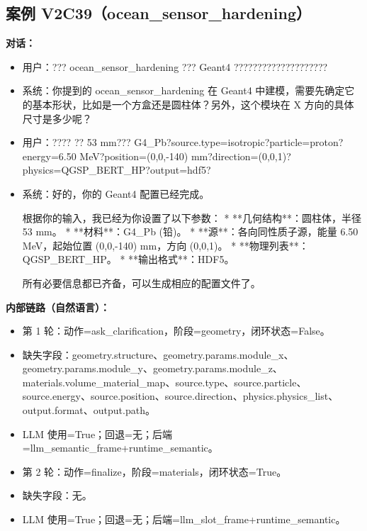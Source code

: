 \documentclass[11pt]{ctexart}
\begin{document}
\subsection{案例 V2C39（ocean\_sensor\_hardening）}
\textbf{对话：}
\begin{itemize}
\item 用户：??? ocean\_sensor\_hardening ??? Geant4 ????????????????????
\item 系统：你提到的 ocean\_sensor\_hardening 在 Geant4 中建模，需要先确定它的基本形状，比如是一个方盒还是圆柱体？另外，这个模块在 X 方向的具体尺寸是多少呢？
\item 用户：???? ?? 53 mm??? G4\_Pb?source.type=isotropic?particle=proton?energy=6.50 MeV?position=(0,0,-140) mm?direction=(0,0,1)?physics=QGSP\_BERT\_HP?output=hdf5?
\item 系统：好的，你的 Geant4 配置已经完成。

根据你的输入，我已经为你设置了以下参数：
*   **几何结构**：圆柱体，半径 53 mm。
*   **材料**：G4\_Pb (铅)。
*   **源**：各向同性质子源，能量 6.50 MeV，起始位置 (0,0,-140) mm，方向 (0,0,1)。
*   **物理列表**：QGSP\_BERT\_HP。
*   **输出格式**：HDF5。

所有必要信息都已齐备，可以生成相应的配置文件了。
\end{itemize}
\textbf{内部链路（自然语言）：}
\begin{itemize}
\item 第 1 轮：动作=ask\_clarification，阶段=geometry，闭环状态=False。
\item 缺失字段：geometry.structure、geometry.params.module\_x、geometry.params.module\_y、geometry.params.module\_z、materials.volume\_material\_map、source.type、source.particle、source.energy、source.position、source.direction、physics.physics\_list、output.format、output.path。
\item LLM 使用=True；回退=无；后端=llm\_semantic\_frame+runtime\_semantic。
\item 第 2 轮：动作=finalize，阶段=materials，闭环状态=True。
\item 缺失字段：无。
\item LLM 使用=True；回退=无；后端=llm\_slot\_frame+runtime\_semantic。
\end{itemize}
\end{document}
